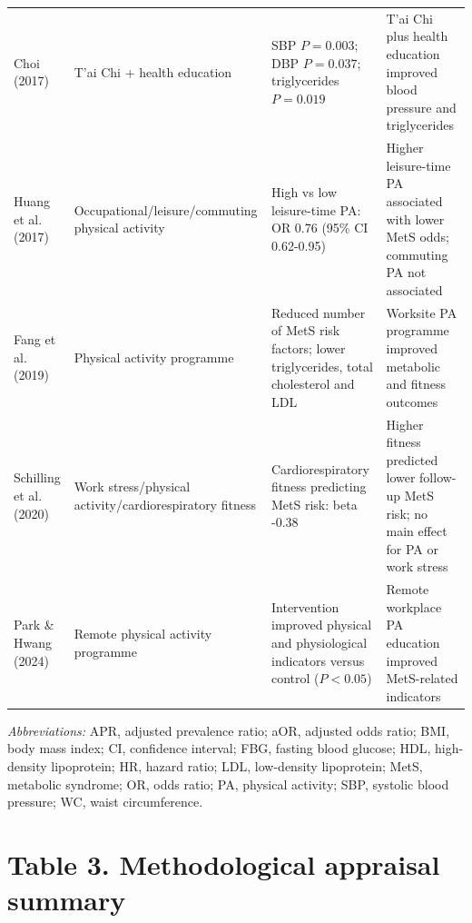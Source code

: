 \begin{longtable}{p{} p{} p{} p{}}
    Choi (2017) & T'ai Chi + health education & SBP \(P = 0.003\); DBP \(P = 0.037\); triglycerides \(P = 0.019\) & T'ai Chi plus health education improved blood pressure and triglycerides \\
    Huang et al. (2017) & Occupational/leisure/commuting physical activity & High vs low leisure-time PA: OR 0.76 (95\% CI 0.62-0.95) & Higher leisure-time PA associated with lower MetS odds; commuting PA not associated \\
    Fang et al. (2019) & Physical activity programme & Reduced number of MetS risk factors; lower triglycerides, total cholesterol and LDL & Worksite PA programme improved metabolic and fitness outcomes \\
    Schilling et al. (2020) & Work stress/physical activity/cardiorespiratory fitness & Cardiorespiratory fitness predicting MetS risk: beta -0.38 & Higher fitness predicted lower follow-up MetS risk; no main effect for PA or work stress \\
    Park \& Hwang (2024) & Remote physical activity programme & Intervention improved physical and physiological indicators versus control (\(P < 0.05\)) & Remote workplace PA education improved MetS-related indicators \\
\bottomrule
\end{longtable}

\noindent\textit{Abbreviations:} APR, adjusted prevalence ratio; aOR, adjusted odds ratio; BMI, body mass index; CI, confidence interval; FBG, fasting blood glucose; HDL, high-density lipoprotein; HR, hazard ratio; LDL, low-density lipoprotein; MetS, metabolic syndrome; OR, odds ratio; PA, physical activity; SBP, systolic blood pressure; WC, waist circumference.

\section*{Table 3. Methodological appraisal summary}


